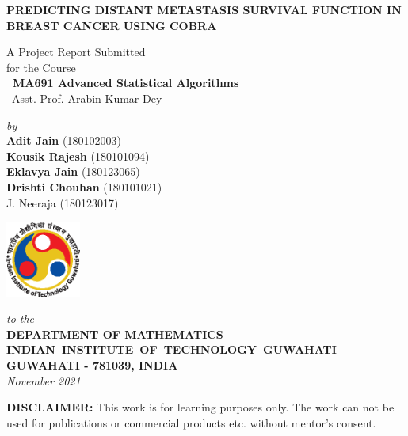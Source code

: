 \documentclass[13pt]{article}
\begin{document}
\begin{titlepage}
\enlargethispage{1cm}

\begin{center}

\textbf{\Large \uppercase{Predicting Distant Metastasis Survival Function in Breast Cancer using COBRA}}
 
 \vspace{2cm}
 
A Project Report Submitted \\
for the Course \\[1cm]

{\bf\Large\ MA691 Advanced Statistical Algorithms }\\[.1in]
{\Large\ Asst. Prof. Arabin Kumar Dey }\\[.1in]

\vspace{2cm}

{\large \emph{by}}\\[5pt]
{\large\bf {Adit Jain}} {\large (180102003)} \\
{\large\bf {Kousik Rajesh}} {\large (180101094)} \\ 
{\large\bf {Eklavya Jain}} {\large (180123065)} \\
{\large\bf {Drishti Chouhan}} {\large (180101021)} \\ 
{\large{J. Neeraja}} {\large (180123017)} 

\vspace{3cm}
\includegraphics[height=2.5cm]{images/iitglogo.eps}

{\em\large to the}\\[10pt]
{\bf\large DEPARTMENT OF MATHEMATICS} \\[5pt]
{\bf\large \mbox{INDIAN INSTITUTE OF TECHNOLOGY GUWAHATI}}\\[5pt]
{\bf\large GUWAHATI - 781039, INDIA}\\[10pt]
{\it\large November 2021}
\end{center}

\vspace{1cm}


\textbf{DISCLAIMER:} This work is for learning purposes only. The work can not be used for publications or commercial products etc. without mentor's consent. 

\end{titlepage}
\end{document}
